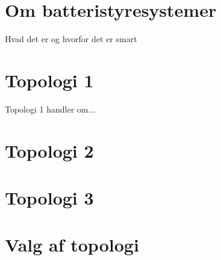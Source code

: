 \section{Om batteristyresystemer}
Hvad det er og hvorfor det er smart
\section{Topologi 1}

Topologi 1 handler om...

\section{Topologi 2}

\section{Topologi 3}

\section{Valg af topologi}